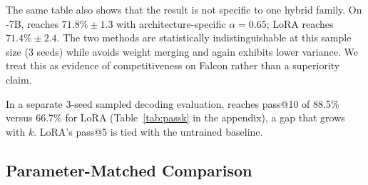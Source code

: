 \documentclass{article}
\begin{document}
The same table also shows that the result is not specific to one hybrid family.
On \falcon{}-7B, \methodshort reaches $71.8\% \pm 1.3$ with architecture-specific
$\alpha{=}0.65$; LoRA reaches $71.4\% \pm 2.4$. The two methods
are statistically indistinguishable at this sample size (3 seeds) while
\methodshort avoids weight merging and again exhibits lower variance. We treat
this as evidence of competitiveness on Falcon rather than a superiority claim.

In a separate 3-seed sampled decoding evaluation, \methodshort reaches pass@10
of 88.5\% versus 66.7\% for LoRA (Table~\ref{tab:passk} in the appendix), a
gap that grows with $k$. LoRA's pass@5 is tied with the untrained baseline.

\begin{table}[t]
\centering
\caption{HumanEval main results on held-out problems 80--163. Qwen results use 10 seeds; Falcon results use 3 seeds unless noted otherwise.}
\label{tab:main}
\small
{}
\par\smallskip{}
\end{table}




\subsection{Parameter-Matched Comparison}
\label{sec:results_matched}
\end{document}
